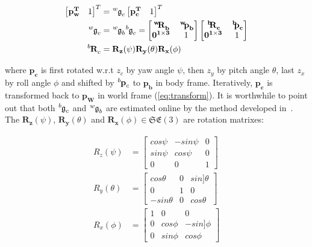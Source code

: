 \begin{equation}\label{eq:transform}
\begin{aligned}
\begin{bmatrix}\mathbf{p^T_w}&1\end{bmatrix}^T&=\tensor*[^w]{\mathfrak{g}}{_c}\begin{bmatrix}\mathbf{p^T_c}&1\end{bmatrix}^T\\
\tensor*[^w]{\mathfrak{g}}{_c}&=\tensor*[^w]{\mathfrak{g}}{_b}\tensor*[^b]{\mathfrak{g}}{_c}=\begin{bmatrix}\mathbf{\tensor*[^w]{R}{_b}}&\mathbf{\tensor*[^w]{p}{_b}}\\\mathbf{0^{1\times3}}&1\end{bmatrix}
\begin{bmatrix}\mathbf{\tensor*[^b]{R}{_c}}&\mathbf{\tensor*[^b]{p}{_c}}\\\mathbf{0^{1\times3}}&1\end{bmatrix}\\
\tensor*[^b]{\mathbf{R}}{_c}&=\mathbf{R_z}(\psi)\mathbf{R_y}(\theta)\mathbf{R_x}(\phi)
\end{aligned}
\end{equation}

\noindent
where $\mathbf{p_c}$ is first rotated w.r.t $z_c$ by yaw angle $\psi$, then $z_y$ by pitch angle $\theta$, last $z_x$ by roll angle $\phi$ and shifted by $\tensor*[^b]{\mathbf{p}}{_c}$ to $\mathbf{p_b}$ in body frame. Iteratively, $\mathbf{p_c}$ is transformed back to $\mathbf{p_W}$ in world frame (\ref{eq:transform}). It is worthwhile to point out that both $\tensor*[^b]{\mathfrak{g}}{_c}$ and $\tensor*[^w]{\mathfrak{g}}{_b}$ are estimated online by the method developed in~\cite{VINS}. The $\mathbf{R_z}(\psi)$, $\mathbf{R_y}(\theta)$ and $\mathbf{R_x}(\phi)\in\mathfrak{SE(3)}$ are rotation matrixes:

\begin{equation}\label{eq:rotation}
\begin{aligned}
R_z(\psi)&=\begin{bmatrix}cos\psi&-sin\psi&0\\sin\psi&cos\psi&0\\0&0&1\end{bmatrix}\\
R_y(\theta)&=\begin{bmatrix}cos\theta&0&sin]\theta\\0&1&0\\-sin\theta&0&cos\theta\end{bmatrix}\\
R_x(\phi)&=\begin{bmatrix}1&0&0\\0&cos\phi&-sin]\phi\\0&sin\phi&cos\phi\end{bmatrix}
\end{aligned}
\end{equation}

